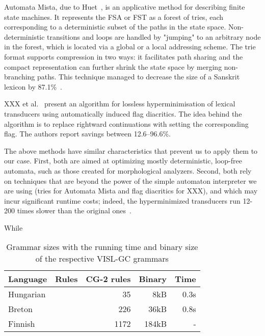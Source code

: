 \documentclass{article}
\begin{document}
Automata Mista, due to Huet~, is an applicative
method for describing finite state machines. It represents the FSA or FST as
a forest of tries, each corresponding to a deterministic subset of the paths in
the state space. Non-deterministic transitions and loops are handled by
"jumping" to an arbitrary node in the forest, which is located via a global or a
local addressing scheme. The trie format supports compression in two ways: it
facilitates path sharing and the compact representation can further shrink the
state space by merging non-branching paths. This technique managed to decrease
the size of a Sanskrit lexicon by 87.1\%~\cite{Huet:2005}.

XXX et al.~ present an algorithm for lossless
hyperminimisation of lexical transducers using automatically induced flag
diacritics. The idea behind the algorithm is to replace rightward continuations
with setting the corresponding flag. The authors report savings between
12.6--96.6\%.

The above methods have similar characteristics that prevent us to apply them to
our case. First, both are aimed at optimizing mostly deterministic, loop-free
automata, such as those created for morphological analyzers. Second, both rely
on techniques that are beyond the power of the simple automaton interpreter
we are using (tries for Automata Mista and flag diacritics for XXX), and which
may incur significant runtime costs; indeed, the hyperminimized transducers run
12-200 times slower than the original ones~\cite{XXX:2014}. 

While


\begin{table*}[h]
  \centering
  \caption{Grammar sizes with the running time and binary size of the respective
           VISL-GC grammars}
  \label{tab:grammar_size}
  \begin{tabular}{ | l | r | r | r | r | }
  \hline
  \textbf{Language} & \textbf{Rules} & \textbf{CG-2 rules} &
  \textbf{Binary} & \textbf{Time} \\
  \hline
  Hungarian & &   35 &   8kB & 0.3s \\
  Breton    & &  226 &  36kB & 0.8s \\
  Finnish   & & 1172 & 184kB & - \\    %
  \hline
  \end{tabular}
\end{table*}
\end{document}
